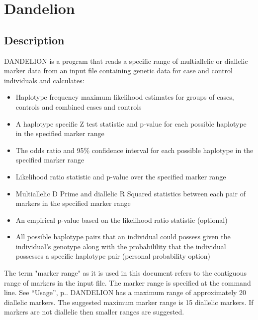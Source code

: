 \section{Dandelion}
\label{sec:dandy}
\subsection{Description}

DANDELION is a program that reads a specific range of multiallelic or diallelic
marker data from an input file containing genetic data for case and control
individuals and calculates:

\begin{itemize}
\item Haplotype frequency maximum likelihood estimates for groups of cases,
  controls and combined cases and controls

\item A haplotype specific Z test statistic and p-value for each possible
  haplotype in the specified marker range

\item The odds ratio and 95\% confidence interval for each possible haplotype in
  the specified marker range

\item  Likelihood ratio statistic and p-value over the specified marker range

\item Multiallelic D Prime and diallelic R Squared statistics between each pair
  of markers in the specified marker range

\item An empirical p-value based on the
  likelihood ratio statistic (optional) 

\item All possible haplotype pairs that an individual could possess given the
  individual's genotype along with the probabilility that the individual
  possesses a specific haplotype pair (personal probability option)

\end{itemize}

The term "marker range" as it is used in this document refers to the contiguous
range of markers in the input file.  The marker range is specified at the
command line.  See ``Usage'', p.\pageref{sec:usage}.  DANDELION has a maximum
range of approximately 20 diallelic markers.  The suggested maximum marker range
is 15 diallelic markers.  If markers are not diallelic then smaller ranges are
suggested.

